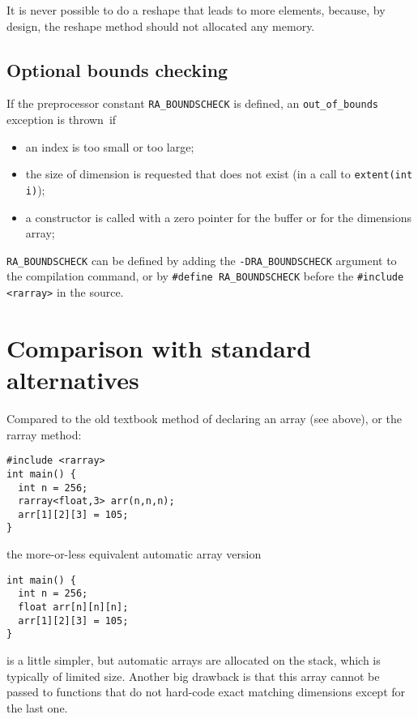 \documentclass[11pt,twoside]{article}
\begin{document}
It is never possible to do a reshape that leads to more elements,
because, by design, the reshape method should not allocated any
memory.


\subsection{Optional bounds checking}

If the preprocessor constant \texttt{{\tt RA\_BOUNDSCHECK}} is defined, an
\texttt{out\_of\_bounds} exception is thrown~if
\begin{itemize}\itemsep0pt\parskip3pt
\item an index is too small or too large;
\item the size of dimension is requested that does not exist (in a call to \texttt{extent(int i)});
\item a constructor is called with a zero pointer for the buffer or for the dimensions array;
\end{itemize}
\texttt{{\tt RA\_BOUNDSCHECK}} can be defined by
adding the {\tt -DRA\_BOUNDSCHECK} argument to the compilation command, or
by \texttt{{\tt\#define RA\_BOUNDSCHECK}} before
the \texttt{{\tt\#include <rarray>}} in the source.


\section{Comparison with standard alternatives}

Compared to the old textbook method of declaring an array (see above), or the rarray method:
\vspace{-5pt}\begin{framed}\vspace{-14pt}%
\begin{verbatim}
#include <rarray>
int main() {
  int n = 256;
  rarray<float,3> arr(n,n,n); 
  arr[1][2][3] = 105;
}
\end{verbatim}
\vspace{-14pt}\end{framed}
\noindent
the more-or-less equivalent automatic array version 
\vspace{-5pt}\begin{framed}\vspace{-14pt}%
\begin{verbatim}
int main() {
  int n = 256;
  float arr[n][n][n]; 
  arr[1][2][3] = 105;
}
\end{verbatim}
\vspace{-14pt}\end{framed}
\noindent
is a little simpler, but automatic arrays are allocated on the stack,
which is typically of limited size. Another big drawback is that this array cannot be passed to functions that do
not hard-code exact matching dimensions except for the last
one.
\end{document}
